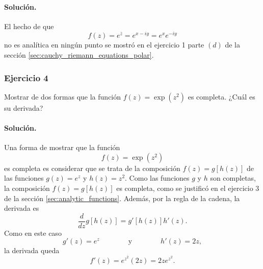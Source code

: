 \documentclass[a4paper]{report}
\begin{document}
\paragraph{Solución.} El hecho de que 
\[
 f(z)=e^{\overline{z}}=e^{x-iy}=e^xe^{-iy}
\]
no es analítica en ningún punto se mostró en el ejercicio 1 parte \((d)\) de la sección \ref{sec:cauchy_riemann_equations_polar}.

\subsubsection{Ejercicio 4}

Mostrar de dos formas que la función \(f(z)=\exp(z^2)\) es completa. ¿Cuál es su derivada?

\paragraph{Solución.} Una forma de mostrar que la función 
\[
 f(z)=\exp(z^2)
\]
es completa es considerar que se trata de la composición \(f(z)=g[h(z)]\) de las funciones \(g(z)=e^z\) y \(h(z)=z^2\). Como las funciones \(g\) y \(h\) son completas, la composición \(f(z)=g[h(z)]\) es completa, como se justificó en el ejercicio 3 de la sección \ref{sec:analytic_functions}. Además, por la regla de la cadena, la derivada es
\[
 \frac{d}{dz}g[h(z)]=g'[h(z)]h'(z).
\]
Como en este caso
\[
 g'(z)=e^z
 \qquad\qquad\textrm{y}\qquad\qquad
 h'(z)=2z,
\]
la derivada queda
\[
 f'(z)=e^{z^2}(2z)=2ze^{z^2}.
\]
\end{document}
